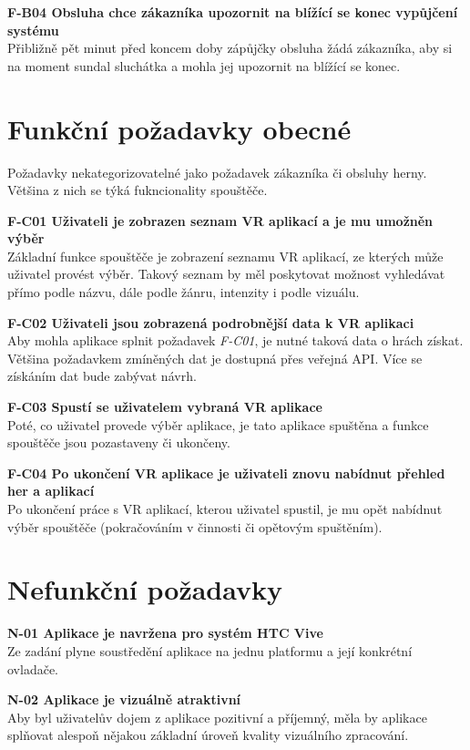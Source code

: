 \textbf{F-B04 Obsluha chce zákazníka upozornit na blížící se konec
vypůjčení systému}\\
Přibližně pět minut před koncem doby zápůjčky obsluha žádá zákazníka,
aby si na moment sundal sluchátka a mohla jej upozornit na blížící se
konec.

\section{Funkční požadavky
obecné}\label{funkux10dnuxed-poux17eadavky-obecnuxe9}

Požadavky nekategorizovatelné jako požadavek zákazníka či obsluhy
herny. Většina z nich se týká fukncionality spouštěče.

\textbf{F-C01 Uživateli je zobrazen seznam VR aplikací a je mu umožněn
výběr}\\
Základní funkce spouštěče je zobrazení seznamu VR aplikací, ze kterých
může uživatel provést výběr. Takový seznam by měl poskytovat možnost
vyhledávat přímo podle názvu, dále podle žánru, intenzity i podle
vizuálu.

\textbf{F-C02 Uživateli jsou zobrazená podrobnější data k VR aplikaci}\\
Aby mohla aplikace splnit požadavek \emph{F-C01}, je nutné taková data o
hrách získat. Většina požadavkem zmíněných dat je dostupná přes veřejná
API. Více se získáním dat bude zabývat návrh.

\textbf{F-C03 Spustí se uživatelem vybraná VR aplikace}\\
Poté, co uživatel provede výběr aplikace, je tato aplikace spuštěna a
funkce spouštěče jsou pozastaveny či ukončeny.

\textbf{F-C04 Po ukončení VR aplikace je uživateli znovu nabídnut
přehled her a aplikací}\\
Po ukončení práce s VR aplikací, kterou uživatel spustil, je mu opět
nabídnut výběr spouštěče (pokračováním v činnosti či opětovým
spuštěním).

\section{Nefunkční požadavky}\label{nefunkux10dnuxed-poux17eadavky}

\textbf{N-01 Aplikace je navržena pro systém HTC Vive}\\
Ze zadání plyne soustředění aplikace na jednu platformu a její konkrétní
ovladače.

\textbf{N-02 Aplikace je vizuálně atraktivní}\\
Aby byl uživatelův dojem z aplikace pozitivní a příjemný, měla by
aplikace splňovat alespoň nějakou základní úroveň kvality vizuálního
zpracování.

